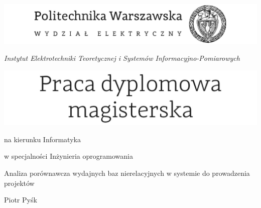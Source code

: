 \begin{titlepage}\begin{center}
    \includegraphics[width=\textwidth]{img/header.png}

    \vspace{34pt}

	\begin{phv}
    	\textit{
        	\fontsize{12pt}{0pt}\selectfont
            Instytut Elektrotechniki Teoretycznej i Systemów Informacyjno-Pomiarowych 
        }
	\end{phv}

    \vspace{34pt}


\includegraphics[width=\textwidth]{img/title.jpg}
    
    \vspace{12pt}

	\begin{phv}
    	\fontsize{12pt}{0pt}\selectfont
        na kierunku Informatyka \\
        
        \vspace{4pt}
        
        w specjalności Inżynieria oprogramowania \\
        
        \vspace{36pt}
        
        \fontsize{14pt}{0pt}\selectfont
        Analiza porównawcza wydajnych baz nierelacyjnych w systemie do prowadzenia projektów \\
        
        \vspace{48pt}
        
        \fontsize{21pt}{0pt}\selectfont
        Piotr Pyśk \\
        
        \vspace{4pt}
        

\end{phv}
\end{center}
\end{titlepage}
